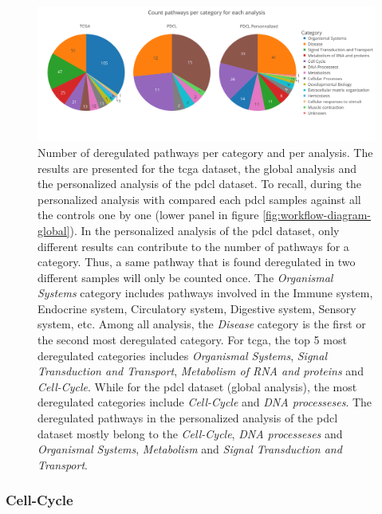 \begin{figure}
    \includegraphics[width=\textwidth]{img/complete-piechart-categ-pdcl}
    \caption{
        Number of deregulated pathways per category and per analysis.
        The results are presented for the \acrshort{tcga} dataset, the global analysis and the personalized analysis of the \acrshort{pdcl} dataset.
        To recall, during the personalized analysis with compared each \acrshort{pdcl} samples against all the controls one by one (lower panel in figure \ref*{fig:workflow-diagram-global}).
        In the personalized analysis of the \acrshort{pdcl} dataset, only different results can contribute to the number of pathways for a category.
        Thus, a same pathway that is found deregulated in two different samples will only be counted once.
        The \textit{Organismal Systems} category includes pathways involved in the Immune system, Endocrine system, Circulatory system, Digestive system, Sensory system, etc.
        Among all analysis, the \textit{Disease} category is the first or the second most deregulated category.
        For \acrshort{tcga}, the top 5 most deregulated categories includes \textit{Organismal Systems}, \textit{Signal Transduction and Transport}, \textit{Metabolism of RNA and proteins} and \textit{Cell-Cycle}.
        While for the \acrshort{pdcl} dataset (global analysis), the most deregulated categories include \textit{Cell-Cycle} and \textit{DNA processeses}.
        The deregulated pathways in the personalized analysis of the \acrshort{pdcl} dataset mostly belong to the \textit{Cell-Cycle}, \textit{DNA processeses} and \textit{Organismal Systems}, \textit{Metabolism} and \textit{Signal Transduction and Transport}.
    }
    \label{fig:complete-piechart-categ-pdcl}
\end{figure}

\subsubsection{Cell-Cycle}

